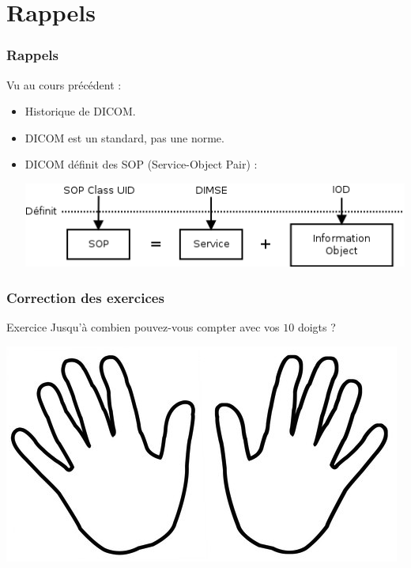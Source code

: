 \section{Rappels}

\frame
{
	\frametitle{Rappels}
	Vu au cours pr\'ec\'edent :
	\begin{itemize}
		\item Historique de DICOM.
		\item DICOM est un standard, pas une norme.
		\item DICOM d\'efinit des SOP (Service-Object Pair) :
		\begin{center}
			\includegraphics[width=\linewidth]{./figures/sop-definition.png}
		\end{center}
	\end{itemize}
}

\frame
{
    \frametitle{Correction des exercices}

    \begin{block}{Exercice}
        Jusqu'\`a combien pouvez-vous compter avec vos $10$ doigts ?
    \end{block}


    \begin{center}
        \includegraphics[width=.5\linewidth]{./figures/mains.png}
    \end{center}

}

